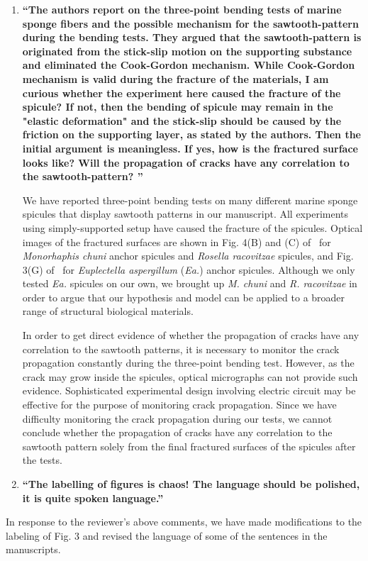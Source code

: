 \documentclass[11pt,letterpaper]{report}
\begin{document}
\begin{enumerate}[label=\textit{1.\arabic*},wide, labelwidth=!, labelindent=0pt]
\begin{enumerate}[label=\textit{2.\arabic*},wide, labelindent=0pt]

\item \label{r2c1}{\bf ``The authors report on the three-point bending tests of marine sponge fibers and the possible mechanism for the sawtooth-pattern during the bending tests. They argued that the sawtooth-pattern is originated from the stick-slip motion on the supporting substance and eliminated the Cook-Gordon mechanism.
While Cook-Gordon mechanism is valid during the fracture of the materials, I am curious whether the experiment here caused the fracture of the spicule?
If not, then the bending of spicule may remain in the "elastic deformation" and the stick-slip should be caused by the friction on the supporting layer, as stated by the authors. Then the initial argument is meaningless.
If yes, how is the fractured surface looks like? Will the propagation of cracks have any correlation to the sawtooth-pattern? ''}


We have reported three-point bending tests on many different marine sponge spicules that display sawtooth patterns in our manuscript. All experiments using simply-supported setup have caused the fracture of the spicules.
Optical images of the fractured surfaces are shown in Fig. 4(B) and (C) of~\cite{kochiyama2021sawtooth} for \textit{Monorhaphis chuni} anchor spicules and \textit{Rosella racovitzae} spicules, and Fig. 3(G) of~\cite{monn2017enhanced} for \textit{Euplectella aspergillum} (\textit{Ea.}) anchor spicules.
Although we only tested \textit{Ea.} spicules on our own, we brought up \textit{M. chuni} and \textit{R. racovitzae} in order to argue that our hypothesis and model can be applied to a broader range of structural biological materials.

In order to get direct evidence of whether the propagation of cracks have any correlation to the sawtooth patterns, it is necessary to monitor the crack propagation constantly during the three-point bending test. However, as the crack may grow inside the spicules, optical micrographs can not provide such evidence. Sophisticated experimental design involving electric circuit may be effective for the purpose of monitoring crack propagation.
Since we have difficulty monitoring the crack propagation during our tests, we cannot conclude whether the propagation of cracks have any correlation to the sawtooth pattern solely from the final fractured surfaces of the spicules after the tests.



\item \label{r2c2}{\bf ``The labelling of figures is chaos! The language should be polished, it is quite spoken language.''}
\end{enumerate}

In response to the reviewer's above comments, we have made modifications to the labeling of Fig. 3 and revised the language of some of the sentences in the manuscripts.


\end{enumerate}

\clearpage



\end{document}
